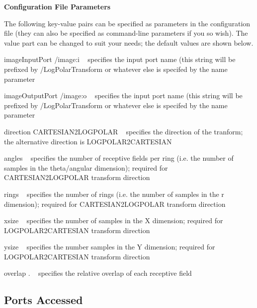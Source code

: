 {\bfseries Configuration File Parameters}

The following key-\/value pairs can be specified as parameters in the configuration file (they can also be specified as command-\/line parameters if you so wish). The value part can be changed to suit your needs; the default values are shown below.


\begin{DoxyItemize}
\item {\ttfamily image\+Input\+Port} {\ttfamily /image}\+:i ~\newline
 specifies the input port name (this string will be prefixed by {\ttfamily /\+Log\+Polar\+Transform} or whatever else is specifed by the name parameter
\item {\ttfamily image\+Output\+Port} {\ttfamily /image}\+:o ~\newline
 specifies the input port name (this string will be prefixed by {\ttfamily /\+Log\+Polar\+Transform} or whatever else is specifed by the name parameter
\item {\ttfamily direction} {\ttfamily C\+A\+R\+T\+E\+S\+I\+A\+N2\+L\+O\+G\+P\+O\+L\+A\+R} ~\newline
 specifies the direction of the tranform; the alternative direction is L\+O\+G\+P\+O\+L\+A\+R2\+C\+A\+R\+T\+E\+S\+I\+A\+N
\item {\ttfamily angles} {} ~\newline
 specifies the number of receptive fields per ring (i.\+e. the number of samples in the theta/angular dimension); required for C\+A\+R\+T\+E\+S\+I\+A\+N2\+L\+O\+G\+P\+O\+L\+A\+R transform direction
\item {\ttfamily rings} {} ~\newline
 specifies the number of rings (i.\+e. the number of samples in the r dimension); required for C\+A\+R\+T\+E\+S\+I\+A\+N2\+L\+O\+G\+P\+O\+L\+A\+R transform direction
\item {\ttfamily xsize} {} ~\newline
 specifies the number of samples in the X dimension; required for L\+O\+G\+P\+O\+L\+A\+R2\+C\+A\+R\+T\+E\+S\+I\+A\+N transform direction
\item {\ttfamily ysize} {} ~\newline
 specifies the number samples in the Y dimension; required for L\+O\+G\+P\+O\+L\+A\+R2\+C\+A\+R\+T\+E\+S\+I\+A\+N transform direction
\item {\ttfamily overlap} {.} ~\newline
 specifies the relative overlap of each receptive field
\end{DoxyItemize}\hypertarget{group__icub__logpolarTransform_portsa_sec}{}\subsection{Ports Accessed}\label{group__icub__logpolarTransform_portsa_sec}

